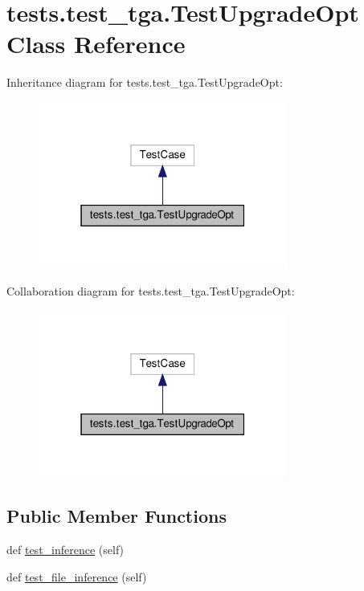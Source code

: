 \hypertarget{classtests_1_1test__tga_1_1TestUpgradeOpt}{}\section{tests.\+test\+\_\+tga.\+Test\+Upgrade\+Opt Class Reference}
\label{classtests_1_1test__tga_1_1TestUpgradeOpt}


Inheritance diagram for tests.\+test\+\_\+tga.\+Test\+Upgrade\+Opt\+:
\nopagebreak
\begin{figure}[H]
\begin{center}
\leavevmode
\includegraphics[width=232pt]{classtests_1_1test__tga_1_1TestUpgradeOpt__inherit__graph}
\end{center}
\end{figure}


Collaboration diagram for tests.\+test\+\_\+tga.\+Test\+Upgrade\+Opt\+:
\nopagebreak
\begin{figure}[H]
\begin{center}
\leavevmode
\includegraphics[width=232pt]{classtests_1_1test__tga_1_1TestUpgradeOpt__coll__graph}
\end{center}
\end{figure}
\subsection*{Public Member Functions}
\begin{DoxyCompactItemize}
\item 
def \hyperlink{classtests_1_1test__tga_1_1TestUpgradeOpt_acaefe84187dab5f848fa33afae999144}{test\+\_\+inference} (self)
\item 
def \hyperlink{classtests_1_1test__tga_1_1TestUpgradeOpt_a8ba19a5f6b229d7f34a3a8ac022e211b}{test\+\_\+file\+\_\+inference} (self)
\end{DoxyCompactItemize}



